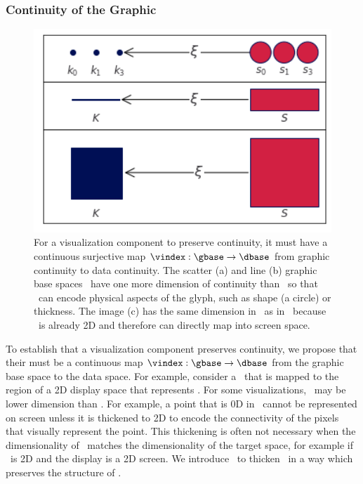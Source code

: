 \documentclass[../main.tex]{subfiles}
\begin{document}
\subsubsection{Continuity of the Graphic \gbase} 
\label{sec:math:graphic:base}
\begin{figure}[H]
    \includegraphics[width=1\textwidth]{figures/math/retraction_maps.png}
    \caption{For a visualization component to preserve continuity, it must have a continuous surjective map $\vindex: \gbase\rightarrow\dbase$ from graphic continuity to data continuity. The scatter (a) and line (b) graphic base spaces \gbase\ have one more dimension of continuity than \dbase\ so that \gbase\ can encode physical aspects of the glyph, such as shape (a circle) or thickness. The image (c) has the same dimension in \gbase\ as in \dbase\ because \dbase\ is already 2D and therefore can directly map into screen space.}
    \label{fig:math:graphic:retraction:map}
\end{figure}
To establish that a visualization component preserves continuity, we propose that their must be a continuous map $\vindex: \gbase\rightarrow\dbase$ from the graphic base space to the data space. For example, consider a \gbase\ that is mapped to the region of a 2D display space that represents \dbase. For some visualizations, \dbase\ may be lower dimension than \gbase. For example, a point that is 0D in \dbase\ cannot be represented on screen unless it is thickened to 2D to encode the connectivity of the pixels that visually represent the point. This thickening is often not necessary when the dimensionality of \dbase\ matches the dimensionality of the target space, for example if \dbase\ is 2D and the display is a 2D screen. We introduce \gbase\ to thicken \dbase\ in a way which preserves the structure of \dbase. 
\end{document}
